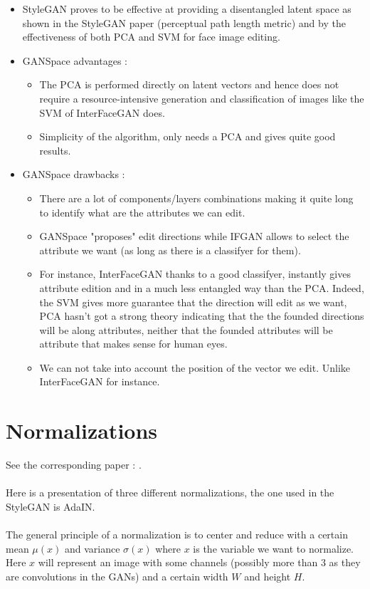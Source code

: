 \documentclass[a4paper]{article}
\begin{document}
\begin{itemize}
    \item StyleGAN proves to be effective at providing a disentangled latent space as shown in the StyleGAN paper (perceptual path length metric) and by the effectiveness of both PCA and SVM for face image editing.
    \item GANSpace advantages : 
    \begin{itemize}
        \item The PCA is performed directly on latent vectors and hence does not require a resource-intensive generation and classification of images like the SVM of InterFaceGAN does.
        \item Simplicity of the algorithm, only needs a PCA and gives quite good results.
    \end{itemize}
    \item GANSpace drawbacks :
    \begin{itemize}
        \item There are a lot of components/layers  combinations making it quite long to identify what are the attributes we can edit.
        \item GANSpace "proposes" edit directions while IFGAN allows to select the attribute we want (as long as there is a classifyer for them).
        \item For instance, InterFaceGAN thanks to a good classifyer, instantly gives attribute edition and in a much less entangled way than the PCA. Indeed, the SVM gives more guarantee that the direction will edit as we want, PCA hasn't got a strong theory indicating that the the founded directions will be along attributes, neither that the founded attributes will be attribute that makes sense for human eyes.
        \item We can not take into account the position of the vector we edit. Unlike InterFaceGAN for instance.
    \end{itemize}
\end{itemize}

\section{Normalizations}\label{Normalization}

See the corresponding paper : \cite{huang2017arbitrary}.
\\\\Here is a presentation of three different normalizations, the one used in the StyleGAN is AdaIN.
\\\\The general principle of a normalization is to center and reduce with a certain mean $\mu(x)$ and variance $\sigma(x)$ where $x$ is the variable we want to normalize. Here $x$ will represent an image with some channels (possibly more than 3 as they are convolutions in the GANs) and a certain width $W$ and height $H$.
\end{document}
